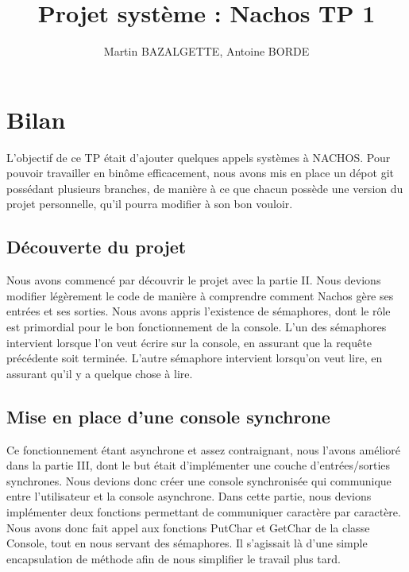 \documentclass[12pt]{article}
\begin{document}
\title{Projet système : Nachos TP 1}
\author{Martin BAZALGETTE, Antoine BORDE}

\maketitle
\newpage
\tableofcontents
\newpage

\section{Bilan}
L'objectif de ce TP était d'ajouter quelques appels systèmes à NACHOS.
\newline
Pour pouvoir travailler en binôme efficacement, nous avons mis en place un dépot git possédant plusieurs branches, de manière à ce que chacun possède une version du projet personnelle, qu'il pourra modifier à son bon vouloir.

\bigbreak
\subsection{Découverte du projet}
Nous avons commencé par découvrir le projet avec la partie II. Nous devions modifier légèrement le code de manière à comprendre comment Nachos gère ses entrées et ses sorties.
Nous avons appris l'existence de sémaphores, dont le rôle est primordial pour le bon fonctionnement de la console.
L'un des sémaphores intervient lorsque l'on veut écrire sur la console, en assurant que la requête précédente soit terminée. L'autre sémaphore intervient lorsqu'on veut lire, en assurant qu'il y a quelque chose à lire.

\bigbreak
\subsection{Mise en place d'une console synchrone}
Ce fonctionnement étant asynchrone et assez contraignant, nous l'avons amélioré dans la partie III, dont le but était d'implémenter une couche d'entrées/sorties synchrones. Nous devions donc créer une console synchronisée qui communique entre l'utilisateur et la console asynchrone.
Dans cette partie, nous devions implémenter deux fonctions permettant de communiquer caractère par caractère. Nous avons donc fait appel aux fonctions \textcolor{red2}{PutChar} et \textcolor{red2}{GetChar} de la classe Console, tout en nous servant des sémaphores.
Il s'agissait là d'une simple encapsulation de méthode afin de nous simplifier le travail plus tard.

\bigbreak
\end{document}
